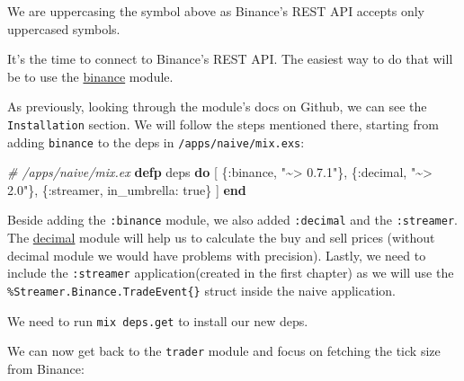 \documentclass[
]{book}
\newenvironment{Shaded}{\begin{snugshade}}{\end{snugshade}}
\newcommand{\CommentTok}[1]{\textcolor[rgb]{0.56,0.35,0.01}{\textit{#1}}}
\newcommand{\ConstantTok}[1]{\textcolor[rgb]{0.00,0.00,0.00}{#1}}
\newcommand{\KeywordTok}[1]{\textcolor[rgb]{0.13,0.29,0.53}{\textbf{#1}}}
\newcommand{\NormalTok}[1]{#1}
\newcommand{\StringTok}[1]{\textcolor[rgb]{0.31,0.60,0.02}{#1}}
\newcommand{\VariableTok}[1]{\textcolor[rgb]{0.00,0.00,0.00}{#1}}
\begin{document}
We are uppercasing the symbol above as Binance's REST API accepts only uppercased symbols.

It's the time to connect to Binance's REST API. The easiest way to do that will be to use the \href{https://github.com/dvcrn/binance.ex}{binance} module.

As previously, looking through the module's docs on Github, we can see the \texttt{Installation} section. We will follow the steps mentioned there, starting from adding \texttt{binance} to the deps in \texttt{/apps/naive/mix.exs}:

\begin{Shaded}
\begin{Highlighting}[]
  \CommentTok{\# /apps/naive/mix.ex}
  \KeywordTok{defp}\NormalTok{ deps }\KeywordTok{do}
\NormalTok{    [}
\NormalTok{      \{}\VariableTok{:binance}\NormalTok{, }\StringTok{"\textasciitilde{}\textgreater{} 0.7.1"}\NormalTok{\},}
\NormalTok{      \{}\VariableTok{:decimal}\NormalTok{, }\StringTok{"\textasciitilde{}\textgreater{} 2.0"}\NormalTok{\},}
\NormalTok{      \{}\VariableTok{:streamer}\NormalTok{, }\VariableTok{in\_umbrella:} \ConstantTok{true}\NormalTok{\}}
\NormalTok{    ]}
  \KeywordTok{end}
\end{Highlighting}
\end{Shaded}

Beside adding the \texttt{:binance} module, we also added \texttt{:decimal} and the \texttt{:streamer}. The \href{https://github.com/ericmj/decimal}{decimal} module will help us to calculate the buy and sell prices (without decimal module we would have problems with precision). Lastly, we need to include the \texttt{:streamer} application(created in the first chapter) as we will use the \texttt{\%Streamer.Binance.TradeEvent\{\}} struct inside the naive application.

We need to run \texttt{mix\ deps.get} to install our new deps.

We can now get back to the \texttt{trader} module and focus on fetching the tick size from Binance:
\end{document}
